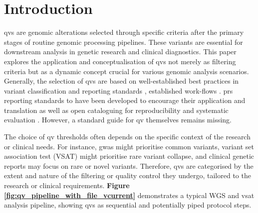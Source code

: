 \section{Introduction}
\label{sec:intro}

\ac{qv}s are genomic alterations selected through specific criteria after the primary stages of routine genomic processing pipelines. These variants are essential for downstream analysis in genetic research and clinical diagnostics. This paper explores the application and conceptualisation of \ac{qv}s not merely as filtering criteria but as a dynamic concept crucial for various genomic analysis scenarios.
Generally, the selection of \ac{qv}s are based on well-established best practices
 in variant classification and reporting standards
\cite{richards2015standards, li2017standards, li2017intervar,riggs2020technical}, 
established work-flows 
\cite{pedersen2021effective,anderson2010data,uffelmann2021genome}.
\ac{prs} reporting standards to have been developed to encourage their application and translation as well as open cataloguing for reproducibility and systematic evaluation
\cite{wand2021improving, lambert2021polygenic}.
However, a standard guide for \ac{qv} themselves remains missing.

The choice of \ac{qv} thresholds often depends on the specific context of the research or clinical needs. 
For instance, \ac{gwas} might prioritise common variants, 
variant set association test (VSAT) might prioritise rare variant collapse, 
and clinical genetic reports may focus on rare or novel variants. 
Therefore, \ac{qv}s are categorised by the extent and nature of the filtering or quality control they undergo, tailored to the research or clinical requirements. 
\textbf{Figure \ref{fig:qv_pipeline_with_file_vcurrent}} 
demonstrates a typical WGS and \ac{vsat} analysis pipeline, showing \ac{qv}s as sequential and potentially piped protocol steps.


